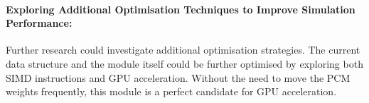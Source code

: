 \paragraph{Exploring Additional Optimisation Techniques to Improve Simulation Performance:} Further research could investigate additional optimisation strategies.
The current data structure and the module itself could be further optimised by exploring both SIMD instructions and GPU acceleration.
Without the need to move the PCM weights frequently, this module is a perfect candidate for GPU acceleration.
